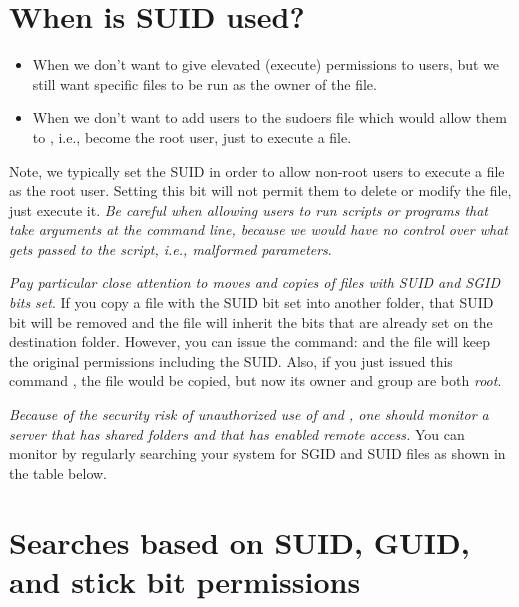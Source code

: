 \section{When is SUID used?}
\begin{itemize}
	\item When we don't want to give elevated (execute) permissions to users, but we still want specific files to be run as the owner of the file.
	\item When we don't want to add users to the sudoers file which would allow them to , i.e., become the root user, just to execute a file.
\end{itemize}

Note, we typically set the SUID in order to allow non-root users to execute a file as the root user. Setting this bit will not permit them to delete or modify the file, just execute it. \textit{Be careful when allowing users to run scripts or programs that take arguments at the command line, because we would have no control over what gets passed to the script, i.e., malformed parameters}.

\textit{Pay particular close attention to moves and copies of files with SUID and SGID bits set}. If you copy a file with the SUID bit set into another folder, that SUID bit will be removed and the file will inherit the bits that are already set on the destination folder. However, you can issue the command:  and the file will keep the original permissions including the SUID. Also, if you just issued this command , the file would be copied, but now its owner and group are both \emph{root}.

\textit{Because of the security risk of unauthorized use of  and , one should monitor a server that has shared folders and that has enabled remote access.} You can monitor by regularly searching your system for SGID and SUID files as shown in the table below.

\section{Searches based on SUID, GUID, and stick bit permissions}

